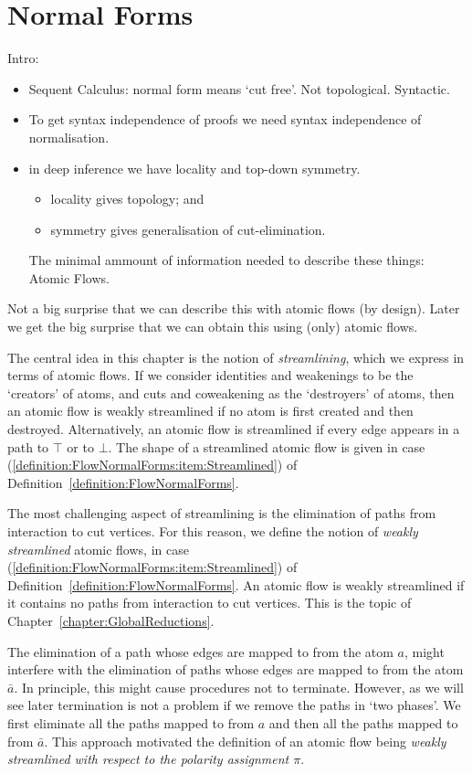 \chapter{Normal Forms}\label{chapter:NormalForms}

Intro:
\begin{itemize}
\item Sequent Calculus: normal form means `cut free'. Not topological. Syntactic.
\item To get syntax independence of proofs we need syntax independence of normalisation.
\item in deep inference we have locality and top-down symmetry.
\begin{itemize}
\item locality gives topology; and
\item symmetry gives generalisation of cut-elimination.
\end{itemize}
The minimal ammount of information needed to describe these things: Atomic Flows.
\end{itemize}

Not a big surprise that we can describe this with atomic flows (by design). Later we get the big surprise that we can obtain this using (only) atomic flows.

The central idea in this chapter is the notion of \emph{streamlining}, which we express in terms of atomic flows. If we consider identities and weakenings to be the `creators' of atoms, and cuts and coweakening as the `destroyers' of atoms, then an atomic flow is weakly streamlined if no atom is first created and then destroyed. Alternatively, an atomic flow is streamlined if every edge appears in a path to $\top$ or to $\bot$. The shape of a streamlined atomic flow is given in case (\ref{definition:FlowNormalForms:item:Streamlined}) of Definition~\ref{definition:FlowNormalForms}.

The most challenging aspect of streamlining is the elimination of paths from interaction to cut vertices. For this reason, we define the notion of \emph{weakly streamlined} atomic flows, in case (\ref{definition:FlowNormalForms:item:Streamlined}) of Definition~\ref{definition:FlowNormalForms}. An atomic flow is weakly streamlined if it contains no paths from interaction to cut vertices. This is the topic of Chapter~\vref{chapter:GlobalReductions}.

The elimination of a path whose edges are mapped to from the atom $a$, might interfere with the elimination of paths whose edges are mapped to from the atom $\bar a$. In principle, this might cause procedures not to terminate. However, as we will see later termination is not a problem if we remove the paths in `two phases'. We first eliminate all the paths mapped to from $a$ and then all the paths mapped to from $\bar a$. This approach motivated the definition of an atomic flow being \emph{weakly streamlined with respect to the polarity assignment $\pi$}.

